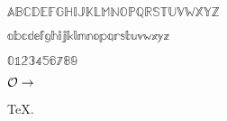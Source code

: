 \documentclass{article}
\begin{document}
$\mathbb{A} \mathbb{B} \mathbb{C} \mathbb{D} \mathbb{E} \mathbb{F} \mathbb{G} \mathbb{H} \mathbb{I} \mathbb{J} \mathbb{K} \mathbb{L} \mathbb{M} \mathbb{N} \mathbb{O} \mathbb{P} \mathbb{Q} \mathbb{R} \mathbb{S} \mathbb{T} \mathbb{U} \mathbb{V} \mathbb{W} \mathbb{X} \mathbb{Y} \mathbb{Z}$

$\mathbb{a} \mathbb{b} \mathbb{c} \mathbb{d} \mathbb{e} \mathbb{f} \mathbb{g} \mathbb{h} \mathbb{i} \mathbb{j} \mathbb{k} \mathbb{l} \mathbb{m} \mathbb{n} \mathbb{o} \mathbb{p} \mathbb{q} \mathbb{r} \mathbb{s} \mathbb{t} \mathbb{u} \mathbb{v} \mathbb{w} \mathbb{x} \mathbb{y} \mathbb{z}$

$\mathbb{0} \mathbb{1} \mathbb{2} \mathbb{3} \mathbb{4} \mathbb{5} \mathbb{6} \mathbb{7} \mathbb{8} \mathbb{9}$

$\cal{O} \rightarrow$

\TeX.
\end{document}
